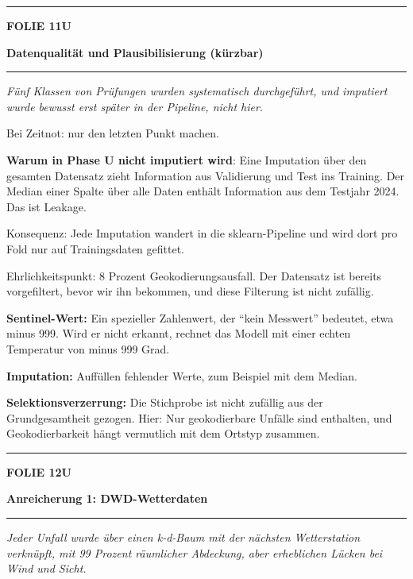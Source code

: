 \documentclass[9pt]{extarticle}
\newcommand{\karte}[3]{%
  \clearpage
  {\color{Accent}\rule{\linewidth}{2.4pt}}\par\vspace{2.5pt}
  {\fontsize{8}{9}\selectfont\bfseries\color{Accent}%
   FOLIE #1\hspace{1.2em}\textbar\hspace{1.2em}#2}\par\vspace{1pt}
  {\fontsize{16}{18}\selectfont\bfseries\color{AccentDark}#3}\par\vspace{3pt}
  {\color{Accent!45}\rule{\linewidth}{0.5pt}}\par\vspace{4pt}%
}
\newcommand{\rubrik}[1]{%
  \vspace{3.5pt}{\fontsize{7.5}{8.5}\selectfont\bfseries\color{Grau}%
  \MakeUppercase{#1}}\par\vspace{1.5pt}}
\newcommand{\kernsatz}[1]{%
  \begin{tcolorbox}[enhanced,sharp corners,boxrule=0pt,
    leftrule=2.2pt,colframe=Accent,colback=AccentPale,
    left=5pt,right=5pt,top=3.5pt,bottom=3.5pt,before skip=1pt,after skip=2pt]
    \color{AccentDark}\itshape #1
  \end{tcolorbox}}
\newcommand{\bg}[2]{\item \textbf{#1:} #2}
\begin{document}
\karte{11}{U}{Datenqualität und Plausibilisierung \textnormal{\small(kürzbar)}}

\kernsatz{Fünf Klassen von Prüfungen wurden systematisch durchgeführt, und imputiert wurde
bewusst erst später in der Pipeline, nicht hier.}

\rubrik{Sagen}
\begin{sag}
  \item Bei Zeitnot: nur den letzten Punkt machen.
  \item \textbf{Warum in Phase U nicht imputiert wird}: Eine Imputation über den gesamten
        Datensatz zieht Information aus Validierung und Test ins Training. Der Median einer
        Spalte über alle Daten enthält Information aus dem Testjahr 2024. Das ist Leakage.
  \item Konsequenz: Jede Imputation wandert in die sklearn-Pipeline und wird dort pro Fold
        nur auf Trainingsdaten gefittet.
  \item Ehrlichkeitspunkt: 8 Prozent Geokodierungsausfall. Der Datensatz ist bereits
        vorgefiltert, bevor wir ihn bekommen, und diese Filterung ist nicht zufällig.
\end{sag}

\rubrik{Begriffe}
\begin{begriff}
  \bg{Sentinel-Wert}{Ein spezieller Zahlenwert, der \enquote{kein Messwert} bedeutet, etwa
      minus 999. Wird er nicht erkannt, rechnet das Modell mit einer echten Temperatur von
      minus 999 Grad.}
  \bg{Imputation}{Auffüllen fehlender Werte, zum Beispiel mit dem Median.}
  \bg{Selektionsverzerrung}{Die Stichprobe ist nicht zufällig aus der Grundgesamtheit gezogen.
      Hier: Nur geokodierbare Unfälle sind enthalten, und Geokodierbarkeit hängt vermutlich
      mit dem Ortstyp zusammen.}
\end{begriff}

\karte{12}{U}{Anreicherung 1: DWD-Wetterdaten}

\kernsatz{Jeder Unfall wurde über einen k-d-Baum mit der nächsten Wetterstation verknüpft,
mit 99 Prozent räumlicher Abdeckung, aber erheblichen Lücken bei Wind und Sicht.}
\end{document}
